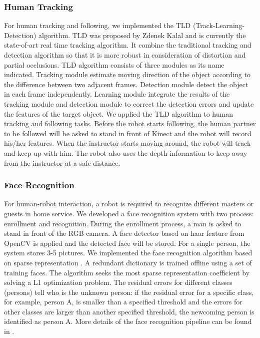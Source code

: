 \subsubsection{Human Tracking}
For human tracking and following, we implemented the TLD (Track-Learning-Detection) algorithm\cite{kalal2012tracking}. TLD was proposed by Zdenek Kalal and is currently the state-of-art real time tracking algorithm. It combine the traditional tracking and detection algorithm so that it is more robust in consideration of distortion and partial occlusions. TLD algorithm consists of three modules as its name indicated. Tracking module estimate moving direction of the object according to the difference between two adjacent frames. Detection module detect the object in each frame independently. Learning module integrate the results of the tracking module and detection module to correct the detection errors and update the features of the target object.
We applied the TLD algorithm to human tracking and following tasks. Before the robot starts following, the human partner to be followed will be asked to stand in front of Kinect and the robot will record his/her features. When the instructor starts moving around, the robot will track and keep up with him. The robot also uses the depth information to keep away from the instructor at a safe distance.
\subsubsection{Face Recognition}
For human-robot interaction, a robot is required to recognize different masters or guests in home service. We developed a face recognition system with two process: enrollment and recognition. During the enrollment process, a man is asked to stand in front of the RGB camera. A face detector based on haar feature from OpenCV is applied and the detected face will be stored. For a single person, the system stores 3-5 pictures.
We implemented the face recognition algorithm based on sparse representation \cite{wright2009robust}. A redundant dictionary is trained offline using a set of training faces. The algorithm seeks the most sparse representation coefficient by solving a L1 optimization problem. The residual errors for different classes (persons) tell who is the unknown person: if the residual error for a specific class, for example, person A, is smaller than a specified threshold and the errors for other classes are larger than another specified threshold, the newcoming person is identified as person A. More details of the face recognition pipeline can be found in \cite{xia2015human}.
